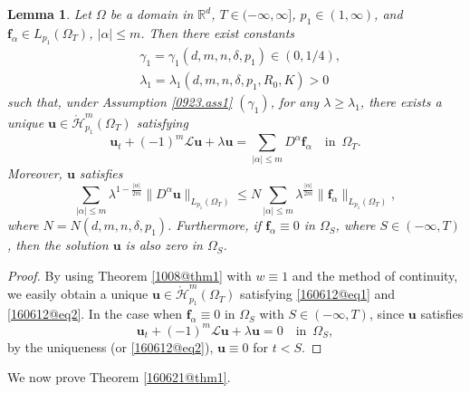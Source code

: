 \documentclass[reqno]{amsart}
\numberwithin{equation}{section}
\theoremstyle{plain}
\newtheorem{lemma}[theorem]{Lemma}
\theoremstyle{definition}
\theoremstyle{remark}
\begin{document}
\begin{lemma}		\label{160612@lem1}
Let $\Omega$ be a domain in ${\mathbb{R}}^d$, $T\in (-\infty,\infty]$, $p_1\in (1,\infty)$, and ${\boldsymbol{f}}_\alpha\in L_{p_1}( \Omega_T)$, $|\alpha|\le m$.
Then there exist constants 
\begin{align*}
&\gamma_1=\gamma_1(d,m,n,\delta,p_1)\in (0,1/4),\\
&\lambda_1=\lambda_1(d,m,n,\delta,p_1, R_0,K)>0
\end{align*}
such that, under Assumption \ref{0923.ass1} $(\gamma_1)$,
for any $\lambda\ge \lambda_1$, there exists a unique  ${\boldsymbol{u}}\in \mathring{\mathcal{H}}_{p_1}^m(\Omega_T)$ satisfying 
\begin{equation}		\label{160612@eq1}
{\boldsymbol{u}}_t+(-1)^m{\mathcal{L}}{\boldsymbol{u}}+\lambda{\boldsymbol{u}}=\sum_{|\alpha| \le m}D^\alpha {\boldsymbol{f}}_\alpha \quad \text{in }\, \Omega_T.
\end{equation}
Moreover, ${\boldsymbol{u}}$ satisfies 
\begin{equation}		\label{160612@eq2}
\sum_{|\alpha| \le m}\lambda^{1-\frac{|\alpha|}{2m}}\|D^\alpha {\boldsymbol{u}}\|_{L_{p_1}(\Omega_T)}\le N\sum_{|\alpha| \le m}\lambda^{\frac{|\alpha|}{2m}}\|{\boldsymbol{f}}_\alpha\|_{L_{p_1}(\Omega_T)},
\end{equation}
where $N=N(d,m,n,\delta,p_1)$.
Furthermore, if ${\boldsymbol{f}}_\alpha\equiv 0$ in $\Omega_S$, where $S\in (-\infty,T)$, then the solution ${\boldsymbol{u}}$ is also zero in $\Omega_S$.
\end{lemma}

\begin{proof}
By using Theorem \ref{1008@thm1} with $w\equiv 1$ and the method of continuity, we easily obtain a unique ${\boldsymbol{u}}\in \mathring{\mathcal{H}}^m_{p_1}(\Omega_T)$ satisfying \eqref{160612@eq1} and \eqref{160612@eq2}.
In the case when ${\boldsymbol{f}}_\alpha \equiv 0$ in $\Omega_S$ with $S\in (-\infty,T)$,  
since ${\boldsymbol{u}}$ satisfies 
$$
{\boldsymbol{u}}_t+(-1)^m{\mathcal{L}}{\boldsymbol{u}}+\lambda {\boldsymbol{u}}=0 \quad \text{in }\, \Omega_S,
$$
by the uniqueness (or \eqref{160612@eq2}), ${\boldsymbol{u}}\equiv 0$ for $t<S$.
\end{proof}

We now prove Theorem \ref{160621@thm1}.
\end{document}
